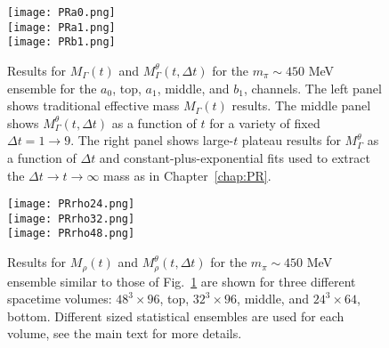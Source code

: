 
\begin{figure}[!t]
  \centering
  \texttt{[image: PRa0.png]} \\
  \texttt{[image: PRa1.png]} \\
  \texttt{[image: PRb1.png]}
  \caption{Results for $M_\Gamma(t)$ and $M_\Gamma^\theta(t,\Delta t)$ for the $m_\pi \sim 450$ MeV ensemble for the $a_0$, top, $a_1$, middle, and $b_1$, channels. The left panel shows traditional effective mass $M_\Gamma(t)$ results. The middle panel shows $M_\Gamma^\theta(t,\Delta t)$ as a function of $t$ for a variety of fixed $\Delta t = 1 \rightarrow 9$. The right panel shows large-$t$ plateau results for $M_\Gamma^\theta$ as a function of $\Delta t$ and constant-plus-exponential fits used to extract the $\Delta t \rightarrow t \rightarrow \infty$ mass as in Chapter~\ref{chap:PR}.
    }
  \label{fig:PRmesons}
\end{figure}


\begin{figure}[!t]
  \centering
  \texttt{[image: PRrho24.png]} \\
  \texttt{[image: PRrho32.png]} \\
  \texttt{[image: PRrho48.png]}
  \caption{Results for $M_\rho(t)$ and $M_\rho^\theta(t,\Delta t)$ for the $m_\pi \sim 450$ MeV ensemble similar to those of Fig.~\ref{fig:PRmesons} are shown for three different spacetime volumes: $48^3\times 96$, top, $32^3\times 96$, middle, and $24^3\times 64$, bottom. Different sized statistical ensembles are used for each volume, see the main text for more details.}
  \label{fig:PRrho}
\end{figure}


